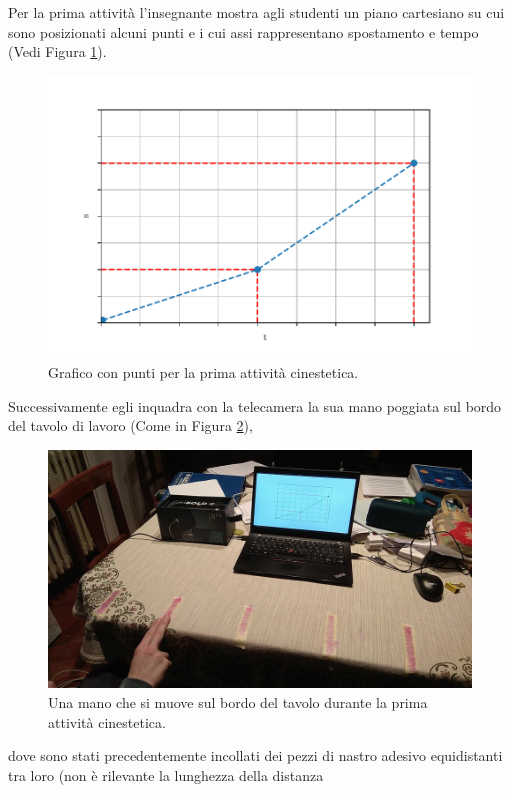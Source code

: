 \documentclass{report} \usepackage[T1]{fontenc} \usepackage[italian]{babel}
\begin{document}
Per la prima attività l’insegnante mostra agli studenti un piano cartesiano su
cui sono posizionati alcuni punti e i cui assi rappresentano spostamento e
tempo (Vedi Figura \ref{fig:kine_plot1}).
\begin{figure}[ht]
\centering
  \includegraphics[width=\textwidth]{kine_plot1}
  \caption{Grafico con punti per la prima attività
           cinestetica.}
  \label{fig:kine_plot1}
\end{figure}
Successivamente egli inquadra con la telecamera la sua mano
poggiata sul bordo del tavolo di lavoro (Come in  Figura \ref{fig:kine_hand}),
\begin{figure}[H]
\centering
  \includegraphics[width=\textwidth]{kine_hand}
  \caption{Una mano che si muove sul bordo del tavolo durante la
           prima attività cinestetica.}
  \label{fig:kine_hand}
\end{figure}
dove sono stati precedentemente incollati dei pezzi di nastro adesivo
equidistanti tra loro (non è rilevante la lunghezza della distanza
\end{document}
